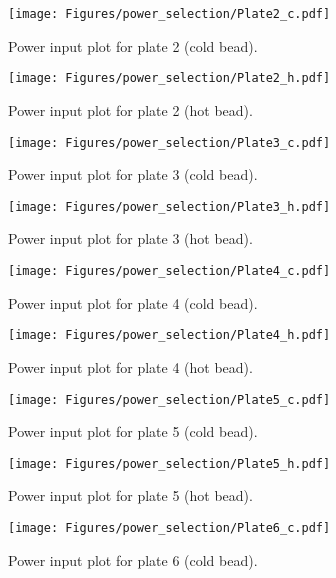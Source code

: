 

\begin{figure}[htp]
   \centering
   \texttt{[image: Figures/power\_selection/Plate2\_c.pdf]}
   \caption{Power input plot for plate 2 (cold bead). }
\end{figure}


\begin{figure}[htp]
   \centering
   \texttt{[image: Figures/power\_selection/Plate2\_h.pdf]}
   \caption{Power input plot for plate 2 (hot bead). }
\end{figure}


\begin{figure}[htp]
   \centering
   \texttt{[image: Figures/power\_selection/Plate3\_c.pdf]}
   \caption{Power input plot for plate 3 (cold bead). }
\end{figure}


\begin{figure}[htp]
   \centering
   \texttt{[image: Figures/power\_selection/Plate3\_h.pdf]}
   \caption{Power input plot for plate 3 (hot bead). }
\end{figure}


\begin{figure}[htp]
   \centering
   \texttt{[image: Figures/power\_selection/Plate4\_c.pdf]}
   \caption{Power input plot for plate 4 (cold bead). }
\end{figure}


\begin{figure}[htp]
   \centering
   \texttt{[image: Figures/power\_selection/Plate4\_h.pdf]}
   \caption{Power input plot for plate 4 (hot bead). }
\end{figure}


\begin{figure}[htp]
   \centering
   \texttt{[image: Figures/power\_selection/Plate5\_c.pdf]}
   \caption{Power input plot for plate 5 (cold bead). }
\end{figure}


\begin{figure}[htp]
   \centering
   \texttt{[image: Figures/power\_selection/Plate5\_h.pdf]}
   \caption{Power input plot for plate 5 (hot bead). }
\end{figure}


\begin{figure}[htp]
   \centering
   \texttt{[image: Figures/power\_selection/Plate6\_c.pdf]}
   \caption{Power input plot for plate 6 (cold bead). }
\end{figure}


